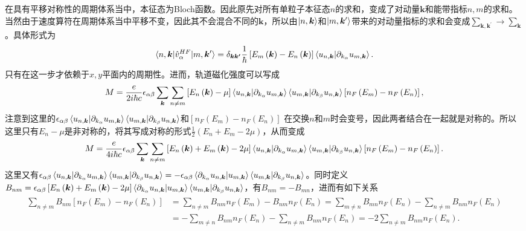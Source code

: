 \documentclass[10pt, oneside]{article}
\newcommand{\pr}{\prime}
\newcommand{\pa}{\partial}
\newcommand{\p}[1]{\left(#1\right)}
\newcommand{\bb}[1]{\left[#1\right]}
\begin{document}
在具有平移对称性的周期体系当中，本征态为Bloch函数。因此原先对所有单粒子本征态\(n\)的求和，变成了对动量\(\bm{k}\)和能带指标\(n,m\)的求和。当然由于速度算符在周期体系当中平移不变，因此其不会混合不同的\(\bm{k}\)，所以由\(\ket{n, \bm{k}}\)和\(\ket{m, \bm{k}^\pr}\)带来的对动量指标的求和会变成\(\sum_{\bm{k},\bm{k}^\pr} \rightarrow \sum_{\bm{k}}\)。具体形式为
\begin{align}
	\braket{n, \bm{k} | \hat{v}^{HF}_{\alpha}| m, \bm{k}^\pr} = \delta_{\bm{k\bm{k}^\pr}} \frac{1}{\hbar} \bb{E_m \p{\bm{k}} - E_n  \p{\bm{k}}} \braket{u_{n,\bm{k}} | \pa_{k_\alpha} u_{m,\bm{k}}}.
\end{align}
只有在这一步才依赖于\(x,y\)平面内的周期性。进而，轨道磁化强度可以写成
\begin{align}
	M = \frac{e}{2 i \hbar c} \epsilon_{\alpha \beta} \sum_{\bm{k}} \sum_{n \neq m} \bb{E_{n}\p{\bm{k}} - \mu} \braket{u_{n,\bm{k}} | \pa_{k_{\alpha}} u_{m,\bm{k}}} \braket{u_{m ,\bm{k}} | \pa_{k_{\beta}} u_{n, \bm{k}}} \bb{n_{F} \p{E_{m}} - n_{F} \p{E_n}} ,
\end{align}
注意到这里的\(\epsilon_{\alpha \beta}\braket{u_{n,\bm{k}} | \pa_{k_{\alpha}} u_{m,\bm{k}}} \braket{u_{m ,\bm{k}} | \pa_{k_{\beta}} u_{n, \bm{k}}} \)和\( \bb{n_{F} \p{E_{m}} - n_{F} \p{E_n}}\) 在交换\(n\)和\(m\)时会变号，因此两者结合在一起就是对称的。所以这里只有\(E_n - \mu\)是非对称的，将其写成对称的形式\(\frac{1}{2} \p{E_n + E_m - 2 \mu}\)，从而变成
\begin{align}
	M = \frac{e}{4 i \hbar c}\epsilon_{\alpha \beta} \sum_{\bm{k}} \sum_{n \neq m} \bb{E_{n}\p{\bm{k}} + E_m \p{\bm{k}} - 2 \mu} \braket{u_{n,\bm{k}} | \pa_{k_{\alpha}} u_{m,\bm{k}}} \braket{u_{m ,\bm{k}} | \pa_{k_{\beta}} u_{n, \bm{k}}} \bb{n_{F} \p{E_{m}} - n_{F} \p{E_n}}.
\end{align}
这里又有\(\epsilon_{\alpha \beta} \braket{u_{n,\bm{k}} | \pa_{k_{\alpha}} u_{m,\bm{k}}} \braket{u_{m ,\bm{k}} | \pa_{k_{\beta}} u_{n, \bm{k}}} = - \epsilon_{\alpha \beta} \braket{\pa_{k_\alpha} u_{n,\bm{k}} | u_{m,\bm{k}}} \braket{u_{m,\bm{k}} | \pa_{k_\beta} u_{n,\bm{k}}}\)。同时定义\(B_{nm} = \epsilon_{\alpha \beta} \bb{E_{n}\p{\bm{k}} + E_m \p{\bm{k}} - 2 \mu} \braket{\pa_{k_\alpha} u_{n,\bm{k}} | u_{m,\bm{k}}} \braket{u_{m,\bm{k}} | \pa_{k_\beta} u_{n,\bm{k}}}\)，有\(B_{nm} = - B_{mn}\)，进而有如下关系
\begin{align}
	\begin{split}
		\sum_{n \neq m} B_{nm} \bb{n_{F} \p{E_{m}} - n_{F} \p{E_n}} &= \sum_{n \neq m} B_{nm} n_{F} \p{E_{m}} - B_{nm}n_{F} \p{E_{n}} = \sum_{m \neq n} B_{mn} n_{F} \p{E_{n}} - \sum_{n \neq m} B_{nm}n_{F} \p{E_{n}} \\
		& = -  \sum_{m \neq n} B_{nm} n_{F} \p{E_n} - \sum_{n \neq m} B_{nm}n_{F} \p{E_{n}} = - 2 \sum_{n \neq m} B_{nm} n_{F} \p{E_n}. 
	\end{split}
\end{align}
\end{document}
